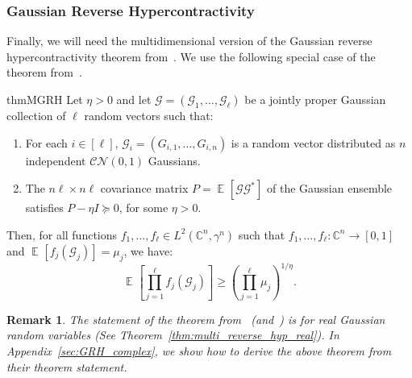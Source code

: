 \documentclass[10pt,a4paper]{amsart}
\newtheorem{remark}[thm]{Remark}
\newcommand\card[1]{\left| {#1} \right|}
\newcommand\Expect[2]{{\mathop{\mathbb{E}}_{#1}\left[ {#2} \right]}}
\renewcommand\geq{\geqslant}
\begin{document}
\subsubsection{Gaussian Reverse Hypercontractivity}
Finally, we will need the multidimensional version of the Gaussian reverse hypercontractivity theorem from~\cite{ChenDafnisPaouris2015HolderGaussian}. We use the following special case of the theorem from~\cite{Mos}. 

\begin{restatable}{thm}{MGRH}{}\label{thm:multi_reverse_hyp}
	Let $\eta>0$ and let $\mathbf{\mathcal{G}} = (\mathcal{G}_1,\ldots,\mathcal{G}_{\ell})$ be a jointly proper Gaussian collection of $\ell$ random vectors such that:
	\begin{enumerate}
		\item For each $i \in [\ell]$, $\mathcal{G}_i = \left(G_{i,1}, \ldots, G_{i,n}\right)$ is a random vector distributed as $n$ independent $\mathcal{C}\mathcal{N}(0,1)$ Gaussians.
		\item  The $n\ell\times n\ell$ covariance matrix $P = \Expect{}{\mathcal{G}\mathcal{G}^*}$ of the Gaussian ensemble satisfies  $P-\eta I\succeq 0$, for some $\eta>0$. %
	\end{enumerate}
	Then, for all functions $f_1,\ldots,f_{\ell} \in L^2(\mathbb{C}^n,\gamma^n)$ such that $f_{1},\ldots,f_{\ell} : \mathbb{C}^n \to [0,1]$ and
	$\Expect{}{f_{j}(\mathcal{G}_{j})} = \mu_j$,
	we have:
	\[
	\Expect{}{\prod_{j=1}^\ell f_{j}(\mathcal{G}_{j})} \geq
	\left( \prod_{j=1}^\ell \mu_j \right)^{1/\eta}.
	\]
\end{restatable}

\begin{remark}
    The statement of the theorem from~\cite{ChenDafnisPaouris2015HolderGaussian} (and~\cite{Mos}) is for real Gaussian random variables (See Theorem~\ref{thm:multi_reverse_hyp_real}). In Appendix~\ref {sec:GRH_complex}, we show how to derive the above theorem from their theorem statement.
\end{remark}

\end{document}
